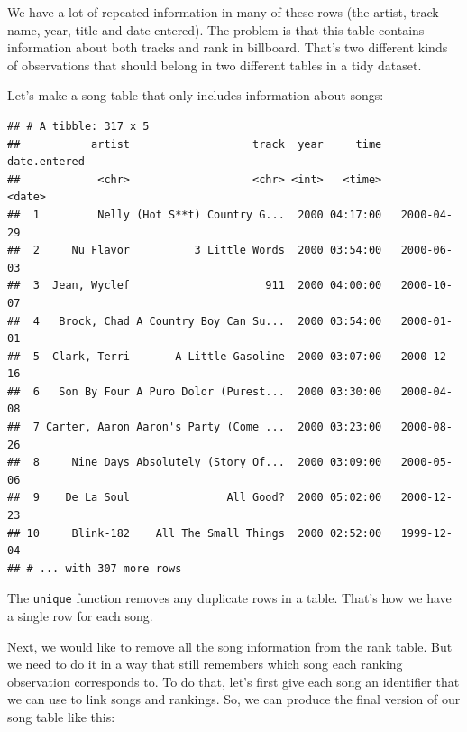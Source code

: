 \documentclass[]{book}
\newenvironment{Shaded}{\begin{snugshade}}{\end{snugshade}}
\newcommand{\KeywordTok}[1]{\textcolor[rgb]{0.13,0.29,0.53}{\textbf{#1}}}
\newcommand{\DataTypeTok}[1]{\textcolor[rgb]{0.13,0.29,0.53}{#1}}
\newcommand{\StringTok}[1]{\textcolor[rgb]{0.31,0.60,0.02}{#1}}
\newcommand{\OperatorTok}[1]{\textcolor[rgb]{0.81,0.36,0.00}{\textbf{#1}}}
\newcommand{\NormalTok}[1]{#1}
\theoremstyle{definition}
\theoremstyle{definition}
\theoremstyle{remark}
\begin{document}
We have a lot of repeated information in many of these rows (the artist,
track name, year, title and date entered). The problem is that this
table contains information about both tracks and rank in billboard.
That's two different kinds of observations that should belong in two
different tables in a tidy dataset.

Let's make a song table that only includes information about songs:

\begin{Shaded}
\end{Shaded}

\begin{verbatim}
## # A tibble: 317 x 5
##           artist                   track  year     time date.entered
##            <chr>                   <chr> <int>   <time>       <date>
##  1         Nelly (Hot S**t) Country G...  2000 04:17:00   2000-04-29
##  2     Nu Flavor          3 Little Words  2000 03:54:00   2000-06-03
##  3  Jean, Wyclef                     911  2000 04:00:00   2000-10-07
##  4   Brock, Chad A Country Boy Can Su...  2000 03:54:00   2000-01-01
##  5  Clark, Terri       A Little Gasoline  2000 03:07:00   2000-12-16
##  6   Son By Four A Puro Dolor (Purest...  2000 03:30:00   2000-04-08
##  7 Carter, Aaron Aaron's Party (Come ...  2000 03:23:00   2000-08-26
##  8     Nine Days Absolutely (Story Of...  2000 03:09:00   2000-05-06
##  9    De La Soul               All Good?  2000 05:02:00   2000-12-23
## 10     Blink-182    All The Small Things  2000 02:52:00   1999-12-04
## # ... with 307 more rows
\end{verbatim}

The \texttt{unique} function removes any duplicate rows in a table.
That's how we have a single row for each song.

Next, we would like to remove all the song information from the rank
table. But we need to do it in a way that still remembers which song
each ranking observation corresponds to. To do that, let's first give
each song an identifier that we can use to link songs and rankings. So,
we can produce the final version of our song table like this:

\begin{Shaded}
\end{Shaded}
\end{document}
